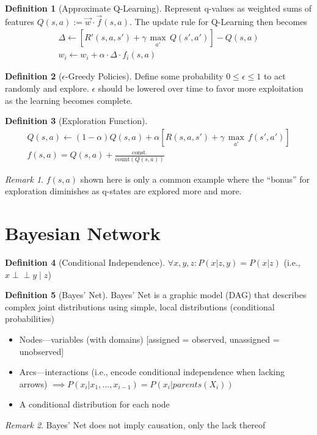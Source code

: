 \documentclass[11pt]{article}
\theoremstyle{definition}
\newtheorem{definition}{Definition}[section]
\theoremstyle{remark}
\newtheorem*{remark}{Remark}
\newcommand{\indep}{\perp \!\!\! \perp}
\begin{document}
\begin{definition}[Approximate Q-Learning] Represent q-values as weighted sums of features $Q(s,a) := \vec{w} \cdot \vec{f}(s,a)$. The update rule for Q-Learning then becomes
\begin{align*}
\Delta \gets [R'(s,a,s')+\gamma \, \underset{a'}{\max}\,Q(s',a')]-Q(s,a) \\
w_i \gets w_i + \alpha \cdot \Delta \cdot f_i(s,a)
\end{align*}
\end{definition}

\begin{definition}[$\epsilon$-Greedy Policies]
Define some probability $0\leq \epsilon \leq 1$ to act randomly and explore. $\epsilon$ should be lowered over time to favor more exploitation as the learning becomes complete.
\end{definition}

\begin{definition}[Exploration Function]
\begin{align*}
Q(s,a) \gets (1-\alpha)Q(s,a) + \alpha [R(s,a,s')+\gamma \, \underset{a'}{\max}\,f(s',a')] \\
f(s,a) = Q(s,a)+\tfrac{\text{const.}}{\text{count}(Q(s,a))}
\end{align*}
\end{definition}

\begin{remark}
$f(s,a)$ shown here is only a common example where the ``bonus'' for exploration diminishes as q-states are explored more and more.
\end{remark}
\clearpage

\section{Bayesian Network}
\begin{definition}[Conditional Independence]
$\forall x,y,z : P(x|z,y)=P(x|z)$ (i.e., $x \indep y \mid z$)
\end{definition}

\begin{definition}[Bayes' Net] Bayes' Net is a graphic model (DAG) that describes complex joint distributions using simple, local distributions (conditional probabilities)
\begin{itemize}
\item Nodes---variables (with domains) [assigned = observed, unassigned = unobserved]
\item Arcs---interactions (i.e., encode conditional independence when lacking arrows) $\implies P(x_i|x_1,\dots,x_{i-1})=P(x_i|parents(X_i))$
\item A conditional distribution for each node
\end{itemize}
\end{definition}
\begin{remark}
Bayes' Net does not imply causation, only the lack thereof
\end{remark}
\end{document}
